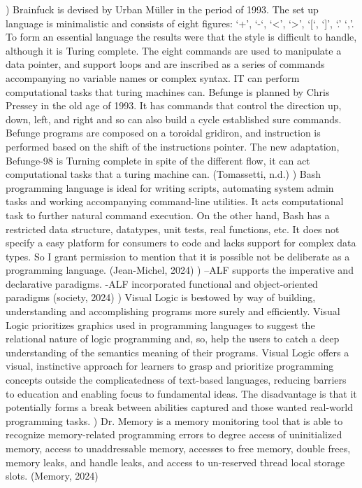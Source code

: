 \documentclass{article}
\begin{document}
) Brainfuck is devised by Urban Müller in the period of 1993. The set up language is minimalistic and consists of eight figures: ‘+’, ‘-‘, ‘<’, ‘>’, ‘[‘, ‘]’, ‘.’ ‘,’. To form an essential language the results were that the style is difficult to handle, although it is Turing complete. The eight commands are used to manipulate a data pointer, and support loops and are inscribed as a series of commands accompanying no variable names or complex syntax. IT can perform computational tasks that turing machines can. Befunge is planned by Chris Pressey in the old age of 1993. It has commands that control the direction up, down, left, and right and so can also build a cycle established sure commands. Befunge programs are composed on a toroidal gridiron, and instruction is performed based on the shift of the instructions pointer. The new adaptation, Befunge-98 is Turning complete in spite of the different flow, it can act computational tasks that a turing machine can. (Tomassetti, n.d.)
\newline\newline
{}) Bash programming language is ideal for writing scripts, automating system admin tasks and working accompanying command-line utilities. It acts computational task to further natural command execution. On the other hand, Bash has a restricted data structure, datatypes, unit tests, real functions, etc. It does not specify a easy platform for consumers to code and lacks support for complex data types. So I grant permission to mention that it is possible not be deliberate as a programming language. (Jean-Michel, 2024)
\newline\newline
{}) –ALF supports the imperative and declarative paradigms. \newline-ALF incorporated functional and object-oriented paradigms (society, 2024)
\newline\newline
{}) Visual Logic is bestowed by way of building, understanding and accomplishing programs more surely and efficiently. Visual Logic prioritizes graphics used in programming languages to suggest the relational nature of logic programming and, so, help the users to catch a deep understanding of the semantics meaning of their programs. Visual Logic offers a visual, instinctive approach for learners to grasp and prioritize programming concepts outside the complicatedness of text-based languages, reducing barriers to education and enabling focus to fundamental ideas. The disadvantage is that it potentially forms a break between abilities captured and those wanted real-world programming tasks.
\newline\newline
{}) Dr. Memory is a memory monitoring tool that is able to recognize memory-related programming errors to degree access of uninitialized memory, access to unaddressable memory, accesses to free memory, double frees, memory leaks, and handle leaks, and access to un-reserved thread local storage slots. (Memory, 2024)
\newline\newline
\nocite{elvis2024}
\nocite{anoe2020}
\nocite{tomassetti}
\nocite{jeanmichel2024}
\nocite{linkedin2024}
\nocite{memory2024}
\printbibliography
\end{document}
